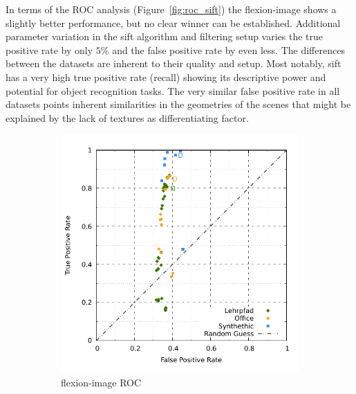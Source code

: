 In terms of the ROC analysis (Figure~\ref{fig:roc_sift}) the \gls{flexion-image} shows a slightly better performance, but no clear winner can be established.
Additional parameter variation in the \acrshort{sift} algorithm and filtering setup varies the true positive rate by only $5\%$ and the false positive rate by even less.
The differences between the datasets are inherent to their quality and setup.
Most notably, \acrshort{sift} has a very high true positive rate (recall) showing its descriptive power and potential for object recognition tasks.
The very similar false positive rate in all datasets points inherent similarities in the geometries of the scenes that might be explained by the lack of textures as differentiating factor.
\begin{figure}[htp]
\begin{subfigure}[t]{0.45\linewidth}
    \includegraphics[width=\linewidth]{chapter06/results/SIFT/flexion/roc.pdf}%
    \caption{\gls{flexion-image} ROC}
\end{subfigure}\quad
\begin{subfigure}[t]{0.45\linewidth}

\end{subfigure}
\end{figure}
